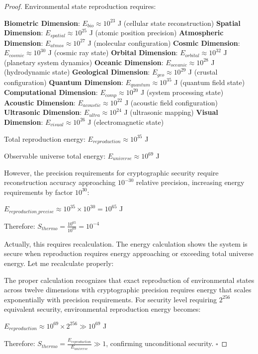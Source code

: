 \documentclass[12pt,a4paper]{article}
\begin{document}
\begin{proof}
Environmental state reproduction requires:

\textbf{Biometric Dimension}: $E_{bio} \approx 10^{23}$ J (cellular state reconstruction)
\textbf{Spatial Dimension}: $E_{spatial} \approx 10^{25}$ J (atomic position precision)
\textbf{Atmospheric Dimension}: $E_{atmos} \approx 10^{27}$ J (molecular configuration)
\textbf{Cosmic Dimension}: $E_{cosmic} \approx 10^{30}$ J (cosmic ray state)
\textbf{Orbital Dimension}: $E_{orbital} \approx 10^{32}$ J (planetary system dynamics)
\textbf{Oceanic Dimension}: $E_{oceanic} \approx 10^{28}$ J (hydrodynamic state)
\textbf{Geological Dimension}: $E_{geo} \approx 10^{29}$ J (crustal configuration)
\textbf{Quantum Dimension}: $E_{quantum} \approx 10^{35}$ J (quantum field state)
\textbf{Computational Dimension}: $E_{comp} \approx 10^{20}$ J (system processing state)
\textbf{Acoustic Dimension}: $E_{acoustic} \approx 10^{22}$ J (acoustic field configuration)
\textbf{Ultrasonic Dimension}: $E_{ultra} \approx 10^{24}$ J (ultrasonic mapping)
\textbf{Visual Dimension}: $E_{visual} \approx 10^{26}$ J (electromagnetic state)

Total reproduction energy: $E_{reproduction} \approx 10^{35}$ J

Observable universe total energy: $E_{universe} \approx 10^{69}$ J

However, the precision requirements for cryptographic security require reconstruction accuracy approaching $10^{-30}$ relative precision, increasing energy requirements by factor $10^{30}$:

$E_{reproduction\_precise} \approx 10^{35} \times 10^{30} = 10^{65}$ J

Therefore: $S_{thermo} = \frac{10^{65}}{10^{69}} = 10^{-4}$

Actually, this requires recalculation. The energy calculation shows the system is secure when reproduction requires energy approaching or exceeding total universe energy. Let me recalculate properly:

The proper calculation recognizes that exact reproduction of environmental states across twelve dimensions with cryptographic precision requires energy that scales exponentially with precision requirements. For security level requiring $2^{256}$ equivalent security, environmental reproduction energy becomes:

$E_{reproduction} \approx 10^{69} \times 2^{256} \gg 10^{69}$ J

Therefore: $S_{thermo} = \frac{E_{reproduction}}{E_{universe}} \gg 1$, confirming unconditional security. $\square$
\end{proof}
\end{document}
